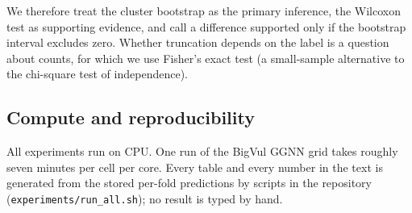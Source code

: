 We therefore treat the cluster bootstrap as the primary inference, the Wilcoxon
test as supporting evidence, and call a difference supported only if the
bootstrap interval excludes zero. Whether truncation depends on the label is a
question about counts, for which we use Fisher's exact test (a small-sample
alternative to the chi-square test of independence).

\subsection{Compute and reproducibility}
All experiments run on CPU. One run of the BigVul GGNN grid takes roughly
seven minutes per cell per core. Every table and every number in the text is
generated from the stored per-fold predictions by scripts in the repository
(\texttt{experiments/run\_all.sh}); no result is typed by hand.
